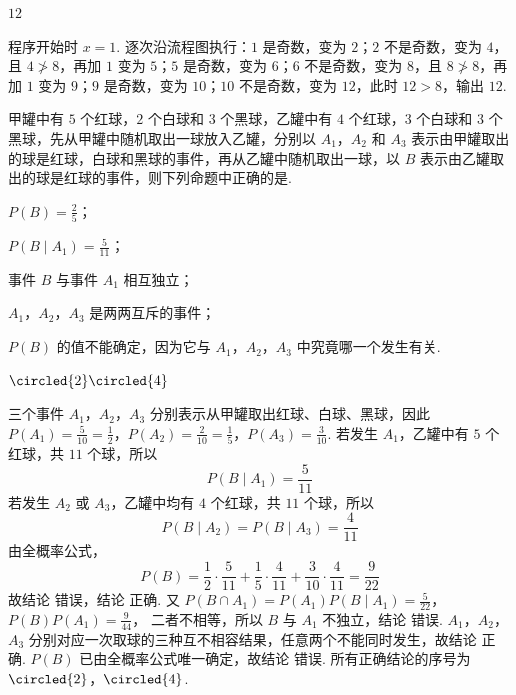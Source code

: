 \begin{answer}
\(12\)
\end{answer}

\begin{solution}
程序开始时 \(x=1\). 逐次沿流程图执行：\(1\) 是奇数，变为 \(2\)；\(2\) 不是奇数，变为 \(4\)，且 \(4\not>8\)，再加 \(1\) 变为 \(5\)；\(5\) 是奇数，变为 \(6\)；\(6\) 不是奇数，变为 \(8\)，且 \(8\not>8\)，再加 \(1\) 变为 \(9\)；\(9\) 是奇数，变为 \(10\)；\(10\) 不是奇数，变为 \(12\)，此时 \(12>8\)，输出 \(12\).
\end{solution}

\begin{problem}
甲罐中有 \(5\) 个红球，\(2\) 个白球和 \(3\) 个黑球，乙罐中有 \(4\) 个红球，\(3\) 个白球和 \(3\) 个黑球，先从甲罐中随机取出一球放入乙罐，分别以 \(A_1\)，\(A_2\) 和 \(A_3\) 表示由甲罐取出的球是红球，白球和黑球的事件，再从乙罐中随机取出一球，以 \(B\) 表示由乙罐取出的球是红球的事件，则下列命题中正确的是\fillinblank{}.

\begin{circlelist}
\item \(P(B)=\frac{2}{5}\)；
\item \(P(B \mid A_1)=\frac{5}{11}\)；
\item 事件 \(B\) 与事件 \(A_1\) 相互独立；
\item \(A_1\)，\(A_2\)，\(A_3\) 是两两互斥的事件；
\item \(P(B)\) 的值不能确定，因为它与 \(A_1\)，\(A_2\)，\(A_3\) 中究竟哪一个发生有关.
\end{circlelist}
\end{problem}

\begin{answer}
\(\circled{2}\circled{4}\)
\end{answer}

\begin{solution}
三个事件 \(A_1\)，\(A_2\)，\(A_3\) 分别表示从甲罐取出红球、白球、黑球，因此
\(P(A_1)=\frac{5}{10}=\frac{1}{2}\)，\(P(A_2)=\frac{2}{10}=\frac{1}{5}\)，\(P(A_3)=\frac{3}{10}\).
若发生 \(A_1\)，乙罐中有 \(5\) 个红球，共 \(11\) 个球，所以
\[
P(B\mid A_1)=\frac{5}{11}
\]
若发生 \(A_2\) 或 \(A_3\)，乙罐中均有 \(4\) 个红球，共 \(11\) 个球，所以
\[
P(B\mid A_2)=P(B\mid A_3)=\frac{4}{11}
\]
由全概率公式，
\[
P(B)=\frac{1}{2}\cdot\frac{5}{11}+\frac{1}{5}\cdot\frac{4}{11}
+\frac{3}{10}\cdot\frac{4}{11}=\frac{9}{22}
\]
故结论  错误，结论  正确. 又
\(P(B\cap A_1)=P(A_1)P(B\mid A_1)=\frac{5}{22}\)，\(P(B)P(A_1)=\frac{9}{44}\)，
二者不相等，所以 \(B\) 与 \(A_1\) 不独立，结论  错误. \(A_1\)，\(A_2\)，\(A_3\) 分别对应一次取球的三种互不相容结果，任意两个不能同时发生，故结论  正确. \(P(B)\) 已由全概率公式唯一确定，故结论  错误. 所有正确结论的序号为 \(\circled{2}\)，\(\circled{4}\).
\end{solution}

